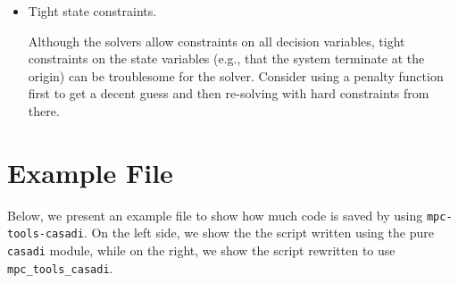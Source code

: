 \documentclass{article}
\providecommand{\sepline}{\vspace{-2em}}
\begin{document}
\begin{itemize}
    \item Tight state constraints.
    
    Although the solvers allow constraints on all decision variables, tight constraints on the state variables (e.g., that the system terminate at the origin) can be troublesome for the solver.
    Consider using a penalty function first to get a decent guess and then re-solving with hard constraints from there.
    
\end{itemize}

\section{Example File}

Below, we present an example file to show how much code is saved by using \texttt{mpc-tools-casadi}.
On the left side, we show the the script written using the pure \texttt{casadi} module, while on the right, we show the script rewritten to use \texttt{mpc\_tools\_casadi}.

\hspace{1em}

\sepline

\begin{parcolumns}{2}
\end{parcolumns}

\sepline

\begin{parcolumns}{2}
\end{parcolumns}
\end{document}
